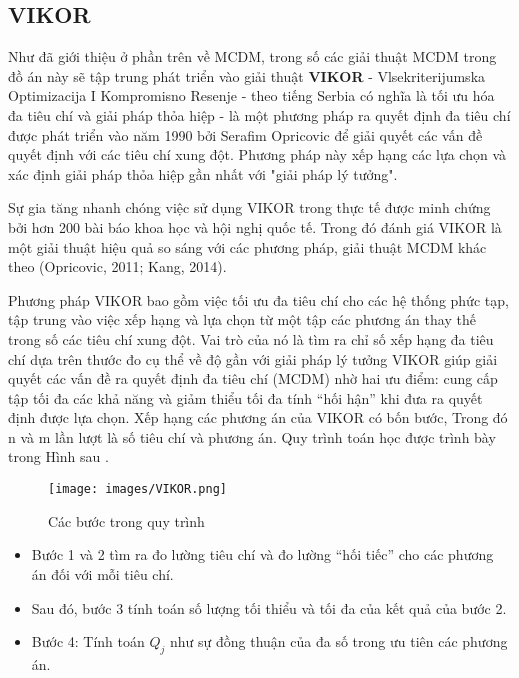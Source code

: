 \subsection{VIKOR}

Như đã giới thiệu ở phần trên về MCDM, trong số các giải thuật MCDM trong đồ án này sẽ tập trung phát triển vào giải thuật \textbf{VIKOR} - Vlsekriterijumska Optimizacija I Kompromisno Resenje - theo tiếng Serbia có nghĩa là tối ưu hóa đa tiêu chí và giải pháp thỏa hiệp - là một phương pháp ra quyết định đa tiêu chí được phát triển vào năm 1990 bởi Serafim Opricovic để giải quyết các vấn đề quyết định với các tiêu chí xung đột. Phương pháp này xếp hạng các lựa chọn và xác định giải pháp thỏa hiệp gần nhất với "giải pháp lý tưởng".

Sự gia tăng nhanh chóng việc sử dụng VIKOR trong thực tế được minh chứng bởi hơn 200 bài báo khoa học và hội nghị quốc tế. Trong đó đánh giá VIKOR là một giải thuật hiệu quả so sáng với các phương pháp, giải thuật MCDM khác theo (Opricovic, 2011; Kang, 2014). 

Phương pháp VIKOR bao gồm việc tối ưu đa tiêu chí cho các hệ thống phức tạp, tập trung vào việc xếp hạng và lựa chọn từ một tập các phương án thay thế trong số các tiêu chí xung đột. Vai trò của nó là tìm ra chỉ số xếp hạng đa tiêu chí dựa trên thước đo cụ thể về độ gần với giải pháp lý tưởng VIKOR giúp giải quyết các vấn đề ra quyết định đa tiêu chí (MCDM) nhờ hai ưu điểm: cung cấp tập tối đa các khả năng và giảm thiểu tối đa tính “hối hận” khi đưa ra quyết định được lựa chọn. Xếp hạng các phương án của VIKOR có bốn bước, 
Trong đó n và m lần lượt là số tiêu chí và phương án. Quy trình toán học được trình bày trong Hình sau \cite{morteza}. 

\begin{figure}[H]
    \centering
    \texttt{[image: images/VIKOR.png]}
    \vspace{0.6cm}
    \caption{Các bước trong quy trình }
\end{figure}

\begin{itemize}
    \item Bước 1 và 2 tìm ra đo lường tiêu chí và đo lường “hối tiếc” cho các phương án đối với mỗi tiêu chí. 
    \item Sau đó, bước 3 tính toán số lượng tối thiểu và tối đa của kết quả của bước 2. 
    \item Bước 4: Tính toán $Q_j$ như sự đồng thuận của đa số trong ưu tiên các phương án.
\end{itemize}

